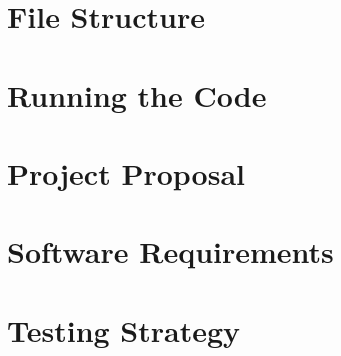 \appendix
\section{File Structure}\label{sec:file-structure}

\section{Running the Code}\label{sec:running-the-code}

\section{Project Proposal}\label{sec:project-proposal}

\section{Software Requirements}\label{sec:software-requirements}

\section{Testing Strategy}\label{sec:testing-strategy}

